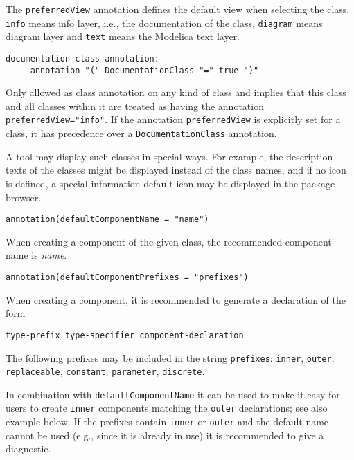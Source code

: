 The \lstinline!preferredView! annotation defines the default view when selecting the
class. \lstinline!info! means info layer, i.e., the documentation of the class,
\lstinline!diagram! means diagram layer and \lstinline!text! means the Modelica text layer.

\begin{lstlisting}[language=grammar]
  documentation-class-annotation:
     annotation "(" DocumentationClass "=" true ")"
\end{lstlisting}

Only allowed as class annotation on any kind of class and implies that this class and all classes within it are treated as having the annotation \lstinline!preferredView="info"!.
If the annotation \lstinline!preferredView! is explicitly set for a class, it has precedence over a \lstinline!DocumentationClass! annotation.

\begin{nonnormative}
A tool may display such classes in special ways.  For example, the description texts of the classes might be displayed instead
of the class names, and if no icon is defined, a special information default icon may be displayed in the package browser.
\end{nonnormative}

\begin{lstlisting}[language=modelica]
 annotation(defaultComponentName = "name")
\end{lstlisting}

When creating a component of the given class, the recommended component name is \emph{name}.

\begin{lstlisting}[language=modelica]
annotation(defaultComponentPrefixes = "prefixes")
\end{lstlisting}

When creating a component, it is recommended to generate a declaration of the form
\begin{lstlisting}[language=grammar]
type-prefix type-specifier component-declaration
\end{lstlisting}

The following prefixes may be included in the string \lstinline!prefixes!: \lstinline!inner!,
\lstinline!outer!, \lstinline!replaceable!, \lstinline!constant!, \lstinline!parameter!, \lstinline!discrete!.

\begin{nonnormative}
In combination with \lstinline!defaultComponentName! it can be used to make it easy for users to create \lstinline!inner! components
matching the \lstinline!outer! declarations; see also example below.  If the prefixes contain \lstinline!inner! or \lstinline!outer!
and the default name cannot be used (e.g., since it is already in use) it is recommended to give a diagnostic.
\end{nonnormative}

